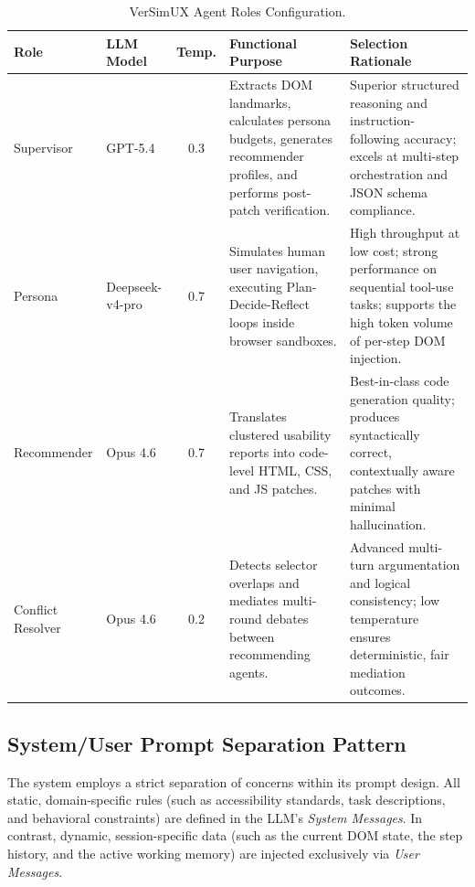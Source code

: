 \begin{table}[htbp]
  \centering
  \caption{VerSimUX Agent Roles Configuration.}
  \label{tab:agent-roles}
  \begin{tabularx}{\textwidth}{@{}l l c X L{4.2cm}@{}}
    \toprule
    \textbf{Role} & \textbf{LLM Model} & \textbf{Temp.} & \textbf{Functional Purpose} & \textbf{Selection Rationale} \\
    \midrule
    Supervisor        & GPT-5.4          & 0.3 & Extracts DOM landmarks, calculates persona budgets, generates recommender profiles, and performs post-patch verification. & Superior structured reasoning and instruction-following accuracy; excels at multi-step orchestration and JSON schema compliance. \\
    \addlinespace
    Persona           & Deepseek-v4-pro  & 0.7 & Simulates human user navigation, executing Plan-Decide-Reflect loops inside browser sandboxes. & High throughput at low cost; strong performance on sequential tool-use tasks; supports the high token volume of per-step DOM injection. \\
    \addlinespace
    Recommender       & Opus 4.6         & 0.7 & Translates clustered usability reports into code-level HTML, CSS, and JS patches. & Best-in-class code generation quality; produces syntactically correct, contextually aware patches with minimal hallucination. \\
    \addlinespace
    Conflict Resolver & Opus 4.6         & 0.2 & Detects selector overlaps and mediates multi-round debates between recommending agents. & Advanced multi-turn argumentation and logical consistency; low temperature ensures deterministic, fair mediation outcomes. \\
    \bottomrule
  \end{tabularx}
\end{table}

\subsection{System/User Prompt Separation Pattern}
\label{sec:prompt-separation}

The system employs a strict separation of concerns within its prompt design. All static, domain-specific rules (such as accessibility standards, task descriptions, and behavioral constraints) are defined in the LLM's \textit{System Messages}. In contrast, dynamic, session-specific data (such as the current DOM state, the step history, and the active working memory) are injected exclusively via \textit{User Messages}. 

